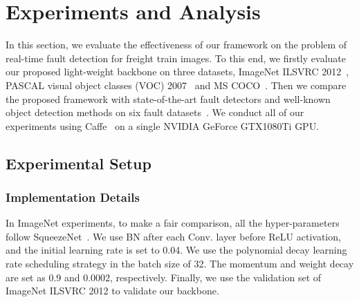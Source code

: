 \section{Experiments and Analysis}
\label{experiment}
In this section, we evaluate the effectiveness of our framework on the problem of real-time fault detection for freight train images. To this end, we firstly evaluate our proposed light-weight backbone on three datasets, ImageNet ILSVRC 2012~\cite{SimonyanZ14a}, PASCAL visual object classes (VOC) 2007~\cite{EveringhamEGWWZ15} and MS COCO~\cite{2014Microsoft}. Then we compare the proposed framework with state-of-the-art fault detectors and well-known object detection methods on six fault datasets~\cite{zhang2018,8911418}. We conduct all of our experiments using Caffe~\cite{JiaSDKLGGD14} on a single NVIDIA GeForce GTX1080Ti GPU.

\subsection{Experimental Setup}
\subsubsection{Implementation Details}
In ImageNet experiments, to make a fair comparison, all the hyper-parameters follow SqueezeNet~\cite{iandola2016squeezenet}. We use BN after each Conv. layer before ReLU activation, and the initial learning rate is set to 0.04. We use the polynomial decay learning rate scheduling strategy in the batch size of 32. The momentum and weight decay are set as 0.9 and 0.0002, respectively. Finally, we use the validation set of ImageNet ILSVRC 2012 to validate our backbone.

